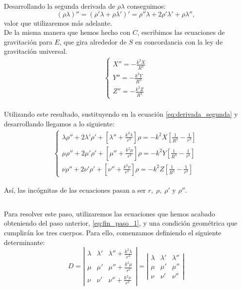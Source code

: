 \documentclass[11pt]{article}
\begin{document}
Desarrollando la segunda derivada de $\rho\lambda$ conseguimos:
\[
(\rho\lambda)''=(\rho'\lambda+\rho\lambda')'=\rho''\lambda+2\rho'\lambda'+\rho\lambda'',
\]
\noindent valor que utilizaremos más adelante.\\

De la misma manera que hemos hecho con $C$, escribimos las ecuaciones de gravitación para $E$, que gira alrededor de $S$ en concordancia con la ley de gravitación universal.
\begin{align}
\left\{
\begin{array}{l}
	X'' = -\frac{k^2X}{R^3}\\
	Y'' = -\frac{k^2Y}{R^3}\\
	Z'' = -\frac{k^2Z}{R^3}
\end{array}
\right.
\label{eq:ley_gravitacion_E}
\end{align}\\

Utilizando este resultado, sustituyendo en la ecuación \ref{eq:derivada_segunda} y desarrollando llegamos a lo siguiente:
\begin{align}
\left\{
\begin{array}{l}
	\lambda\rho''+2\lambda'\rho'+[\lambda''+\frac{k^2\lambda}{r^3}]\rho=-k^2X[\frac{1}{R^3}-\frac{1}{r^3}]\\
	\mu\rho''+2\mu'\rho'+[\mu''+\frac{k^2\mu}{r^3}]\rho=-k^2Y[\frac{1}{R^3}-\frac{1}{r^3}]\\
	\nu\rho''+2\nu'\rho'+[\nu''+\frac{k^2\nu}{r^3}]\rho=-k^2Z[\frac{1}{R^3}-\frac{1}{r^3}]
\end{array}
\right.
\label{eq:fin_paso_1}
\end{align}

Así, las incógnitas de las ecuaciones pasan a ser $r, \; \rho, \; \rho'$ y $\rho''$.\\

\subsection{}
Para resolver este paso, utilizaremos las ecuaciones que hemos acabado obteniendo del paso anterior, \ref{eq:fin_paso_1}, y una condición geométrica que cumplirán los tres cuerpos. Para ello, comenzamos definiendo el siguiente determinante:
\[
D =
\left|
\begin{array}{ccc}
	\lambda & \lambda' & \lambda''+\frac{k^2\lambda}{r^3}\\
	\mu & \mu' & \mu''+\frac{k^2\mu}{r^3}\\
	\nu & \nu' & \nu''+\frac{k^2\nu}{r^3}
\end{array}
\right|
=
\left|
\begin{array}{ccc}
	\lambda & \lambda' & \lambda''\\
	\mu & \mu' & \mu''\\
	\nu & \nu' & \nu''
\end{array}
\right|
\]
\end{document}
